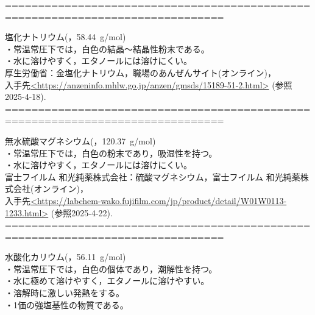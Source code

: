 ===============================================================================
\item 塩化ナトリウム(，58.44\ g/mol)\cite{7}\\
    \hspace{0pt}・常温常圧下では，白色の結晶〜結晶性粉末である。\\
    \hspace{0pt}・水に溶けやすく，エタノールには溶けにくい。\\
    
  厚生労働省：金塩化ナトリウム，職場のあんぜんサイト(オンライン)，\\
           入手先\url{<https://anzeninfo.mhlw.go.jp/anzen/gmsds/15189-51-2.html>}
           (参照2025-4-18).
===============================================================================
\item 無水硫酸マグネシウム(，120.37\ g/mol)\cite{8}\\
    \hspace{0pt}・常温常圧下では，白色の粉末であり，吸湿性を持つ。\\
    \hspace{0pt}・水に溶けやすく，エタノールには溶けにくい。\\
    
  富士フイルム 和光純薬株式会社：硫酸マグネシウム，富士フイルム 和光純薬株式会社(オンライン)，\\
           入手先\url{<https://labchem-wako.fujifilm.com/jp/product/detail/W01W0113-1233.html>}
           (参照2025-4-22).
===============================================================================
\item 水酸化カリウム(，56.11\ g/mol)\cite{9}\\
    \hspace{0pt}・常温常圧下では，白色の個体であり，潮解性を持つ。\\
    \hspace{0pt}・水に極めて溶けやすく，エタノールに溶けやすい。\\
    \hspace{0pt}・溶解時に激しい発熱をする。\\
    \hspace{0pt}・1価の強塩基性の物質である。\\


